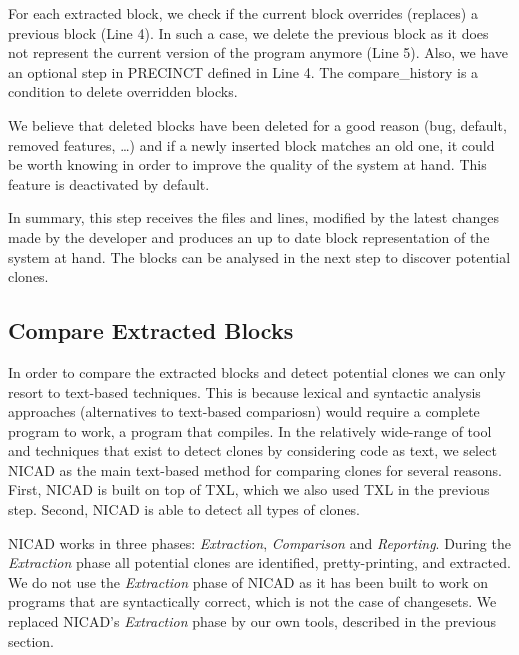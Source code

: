 \documentclass[conference]{IEEEtran}
\begin{document}
For each extracted block, we check if the current block overrides (replaces) a previous block (Line 4).
In such a case, we delete the previous block as it does not represent the current version of the program anymore (Line 5).
Also, we have an optional step in PRECINCT defined in Line 4. The compare\_history is a condition to delete overridden blocks.

We believe that deleted blocks have been deleted for a good reason (bug, default, removed features, \ldots) and if a newly inserted block matches an old one, it could be worth knowing in order to improve the quality of the system at hand.
This feature is deactivated by default.

In summary, this step receives the files and lines, modified by the latest changes made by the developer and produces an up to date block representation of the system at hand. The blocks can be analysed in the next step to discover potential clones.

\subsection{Compare Extracted Blocks}
\label{sub:Compare Extracted Blocks}

In order to compare the extracted blocks and detect potential clones we can only resort to text-based techniques.
This is because lexical and syntactic analysis approaches (alternatives to text-based compariosn) would require a complete program to work, a program that compiles. In the relatively wide-range of tool and techniques that exist to detect clones by considering code as text\cite{Johnson1993,Johnson1994,Marcus,Manber1994,StephaneDucasse,Wettel2005}, we select NICAD as the main text-based method for comparing clones \cite{Cordy2011} for several reasons.
First, NICAD is built on top of TXL, which we also used TXL in the previous step.
Second, NICAD is able to detect all types of clones.

NICAD  works in three phases: \textit{Extraction}, \textit{Comparison} and \textit{Reporting}. During the \textit{Extraction} phase all potential clones are identified, pretty-printing, and extracted.
We do not use the \textit{Extraction} phase of NICAD as it has been built to work on programs that are syntactically correct, which is not the case of changesets.
We replaced NICAD's \textit{Extraction} phase by our own tools, described in the previous section.
\end{document}
